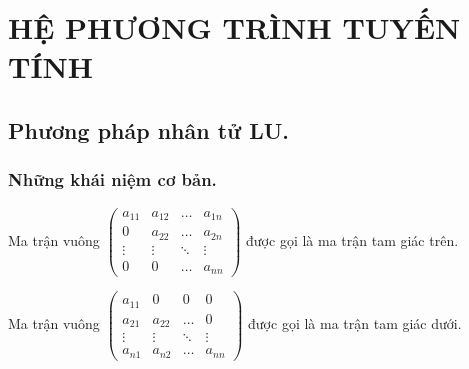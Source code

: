\documentclass[12pt, a4paper]{report}
\begin{document}
\chapter{HỆ PHƯƠNG TRÌNH TUYẾN TÍNH}
\section{Phương pháp nhân tử LU.}
\subsection{Những khái niệm cơ bản.}
Ma trận vuông $\begin{pmatrix}
    a_{11} & a_{12} &  \dots  & a_{1n} \\
    0 & a_{22} &  \dots  & a_{2n} \\
    \vdots & \vdots & \ddots & \vdots\\
    0 & 0 &  \dots  & a_{nn}
\end{pmatrix}$ được gọi là ma trận tam giác trên. 

Ma trận vuông $\begin{pmatrix}
    a_{11} & 0 & 0  & 0 \\
    a_{21} & a_{22} & \dots  & 0 \\
    \vdots & \vdots & \ddots & \vdots \\
    a_{n1} & a_{n2} & \dots  & a_{nn}
\end{pmatrix}$ được gọi là ma trận tam giác dưới.
\end{document}
